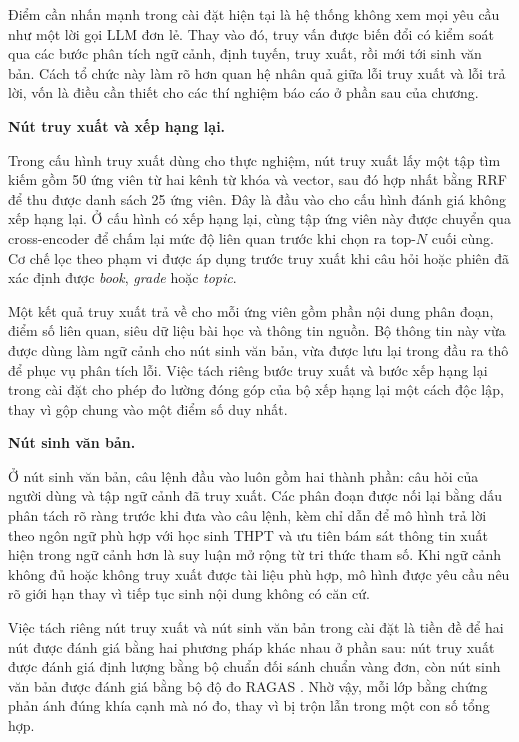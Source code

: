 \documentclass[../DoAn.tex]{subfiles}
\begin{document}
Điểm cần nhấn mạnh trong cài đặt hiện tại là hệ thống không xem mọi yêu cầu như một lời gọi LLM đơn lẻ. Thay vào đó, truy vấn được biến đổi có kiểm soát qua các bước phân tích ngữ cảnh, định tuyến, truy xuất, rồi mới tới sinh văn bản. Cách tổ chức này làm rõ hơn quan hệ nhân quả giữa lỗi truy xuất và lỗi trả lời, vốn là điều cần thiết cho các thí nghiệm báo cáo ở phần sau của chương.

\textbf{Nút truy xuất và xếp hạng lại.}

Trong cấu hình truy xuất dùng cho thực nghiệm, nút truy xuất lấy một tập tìm kiếm gồm 50 ứng viên từ hai kênh từ khóa và vector, sau đó hợp nhất bằng RRF để thu được danh sách 25 ứng viên. Đây là đầu vào cho cấu hình đánh giá không xếp hạng lại. Ở cấu hình có xếp hạng lại, cùng tập ứng viên này được chuyển qua cross-encoder để chấm lại mức độ liên quan trước khi chọn ra top-$N$ cuối cùng. Cơ chế lọc theo phạm vi được áp dụng trước truy xuất khi câu hỏi hoặc phiên đã xác định được \textit{book}, \textit{grade} hoặc \textit{topic}.

Một kết quả truy xuất trả về cho mỗi ứng viên gồm phần nội dung phân đoạn, điểm số liên quan, siêu dữ liệu bài học và thông tin nguồn. Bộ thông tin này vừa được dùng làm ngữ cảnh cho nút sinh văn bản, vừa được lưu lại trong đầu ra thô để phục vụ phân tích lỗi. Việc tách riêng bước truy xuất và bước xếp hạng lại trong cài đặt cho phép đo lường đóng góp của bộ xếp hạng lại một cách độc lập, thay vì gộp chung vào một điểm số duy nhất.

\textbf{Nút sinh văn bản.}

Ở nút sinh văn bản, câu lệnh đầu vào luôn gồm hai thành phần: câu hỏi của người dùng và tập ngữ cảnh đã truy xuất. Các phân đoạn được nối lại bằng dấu phân tách rõ ràng trước khi đưa vào câu lệnh, kèm chỉ dẫn để mô hình trả lời theo ngôn ngữ phù hợp với học sinh THPT và ưu tiên bám sát thông tin xuất hiện trong ngữ cảnh hơn là suy luận mở rộng từ tri thức tham số. Khi ngữ cảnh không đủ hoặc không truy xuất được tài liệu phù hợp, mô hình được yêu cầu nêu rõ giới hạn thay vì tiếp tục sinh nội dung không có căn cứ.

Việc tách riêng nút truy xuất và nút sinh văn bản trong cài đặt là tiền đề để hai nút được đánh giá bằng hai phương pháp khác nhau ở phần sau: nút truy xuất được đánh giá định lượng bằng bộ chuẩn đối sánh chuẩn vàng đơn, còn nút sinh văn bản được đánh giá bằng bộ độ đo RAGAS \cite{es2023ragas}. Nhờ vậy, mỗi lớp bằng chứng phản ánh đúng khía cạnh mà nó đo, thay vì bị trộn lẫn trong một con số tổng hợp.
\end{document}
